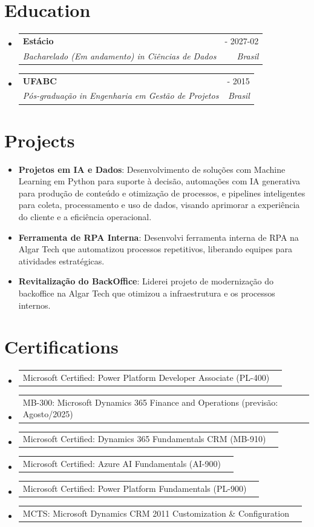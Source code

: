 \documentclass[a4paper,11pt]{article}
\makeatletter
\newcommand{\resumeItem}[1]{
  \item\small{
    {#1 \vspace{-2pt}}
  }
}
\newcommand{\resumeSubheading}[4]{
  \vspace{-1pt}\item
  \begin{tabular*}{0.97\textwidth}{l@{\extracolsep{\fill}}r}
    \textbf{#1} & #2 \\
    \textit{\small#3} & \textit{\small #4} \\
  \end{tabular*}\vspace{-5pt}
}
\newcommand{\resumeCertification}[2]{%
  \item
  \begin{tabular*}{0.97\textwidth}{@{}l@{\extracolsep{\fill}}r@{}}
    #1 & \text{#2} \\
  \end{tabular*}\vspace{-4pt}
}
\newcommand{\resumeSubItem}[2]{\resumeItem{#1: #2}\vspace{-4pt}}
\newcommand{\resumeSubHeadingListStart}{\begin{itemize}[leftmargin=0em, itemindent=0em, label={}, itemsep=0ex]}
\newcommand{\resumeSubHeadingListEnd}{\end{itemize}}
\makeatother
\begin{document}
\section{Education}
\resumeSubHeadingListStart

\resumeSubheading
{Estácio}{ - 2027-02}
{Bacharelado (Em andamento) in Ciências de Dados}{Brasil}

\resumeSubheading
{UFABC}{ - 2015}
{Pós-graduação in Engenharia em Gestão de Projetos}{Brasil}
\resumeSubHeadingListEnd

\section{Projects}
\resumeSubHeadingListStart
\resumeSubItem{\textbf{Projetos em IA e Dados}}{Desenvolvimento de soluções com Machine Learning em Python para suporte à decisão, automações com IA generativa para produção de conteúdo e otimização de processos, e pipelines inteligentes para coleta, processamento e uso de dados, visando aprimorar a experiência do cliente e a eficiência operacional.}
\resumeSubItem{\textbf{Ferramenta de RPA Interna}}{Desenvolvi ferramenta interna de RPA na Algar Tech que automatizou processos repetitivos, liberando equipes para atividades estratégicas.}
\resumeSubItem{\textbf{Revitalização do BackOffice}}{Liderei projeto de modernização do backoffice na Algar Tech que otimizou a infraestrutura e os processos internos.}
\resumeSubHeadingListEnd

\section{Certifications}
\resumeSubHeadingListStart
\resumeCertification{Microsoft Certified: Power Platform Developer Associate (PL-400)}{2025}{}{}
\resumeCertification{MB-300: Microsoft Dynamics 365 Finance and Operations (previsão: Agosto/2025)}{2025}{}{}
\resumeCertification{Microsoft Certified: Dynamics 365 Fundamentals CRM (MB-910)}{2023}{}{}
\resumeCertification{Microsoft Certified: Azure AI Fundamentals (AI-900)}{2025}{}{}
\resumeCertification{Microsoft Certified: Power Platform Fundamentals (PL-900)}{2023}{}{}
\resumeCertification{MCTS: Microsoft Dynamics CRM 2011 Customization \& Configuration}{2013}{}{}
\resumeSubHeadingListEnd
\end{document}
